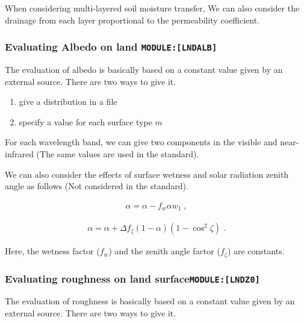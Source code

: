 When considering multi-layered soil moisture transfer, We can also
consider the drainage from each layer proportional to the permeability
coefficient.

\hypertarget{evaluating-albedo-on-land-modulelndalb}{%
\subsubsection{\texorpdfstring{Evaluating Albedo on land
\texttt{MODULE:{[}LNDALB{]}}}{Evaluating Albedo on land MODULE:{[}LNDALB{]}}}\label{evaluating-albedo-on-land-modulelndalb}}

The evaluation of albedo is basically based on a constant value given by
an external source. There are two ways to give it.

\begin{enumerate}
\def\labelenumi{\arabic{enumi}.}
\item
  give a distribution in a file
\item
  specify a value for each surface type \(m\)
\end{enumerate}

For each wavelength band, we can give two components in the visible and
near-infrared (The same values are used in the standard).

We can also consider the effects of surface wetness and solar radiation
zenith angle as follows (Not considered in the standard).

\begin{eqnarray}
  \alpha = \alpha - f_w \alpha w_1 \; ,
\end{eqnarray}

\begin{eqnarray}
  \alpha = \alpha + \Delta f_{\zeta} (1 - \alpha)(1 - \cos^2 \zeta) \; .
\end{eqnarray}

Here, the wetness factor (\(f_w\)) and the zenith angle factor
(\(f_{\zeta}\)) are constants.

\hypertarget{evaluating-roughness-on-land-surfacemodulelndz0}{%
\subsubsection{\texorpdfstring{Evaluating roughness on land
surface\texttt{MODULE:{[}LNDZ0{]}}}{Evaluating roughness on land surfaceMODULE:{[}LNDZ0{]}}}\label{evaluating-roughness-on-land-surfacemodulelndz0}}

The evaluation of roughness is basically based on a constant value given
by an external source. There are two ways to give it.

